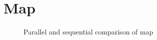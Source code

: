 \section{Map}
\label{sec:map}

\begin{figure}[htb]
  \centering
  
  \caption{Parallel and sequential comparison of map}
  \label{fig:par seq map}
\end{figure}
